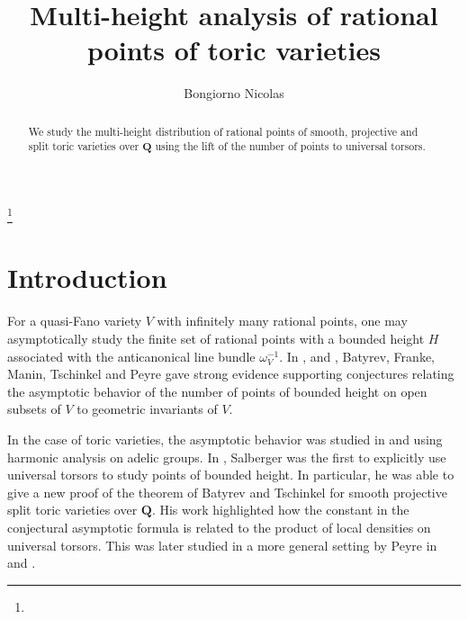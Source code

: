 \documentclass{proc-l}
\newcommand{\Z}{\mathbf{Z}}
\newcommand{\Q}{\mathbf{Q}}
\newcommand{\w}{\omega}
\theoremstyle{definition}
\theoremstyle{remark}
\numberwithin{equation}{section}
\begin{document}
\title[Multi-height analysis on toric varieties]{Multi-height analysis of rational points of toric varieties}


\author{Bongiorno Nicolas}
\address{}
\curraddr{}
\thanks{}




\date{}

\dedicatory{}


\begin{abstract}
We study the multi-height distribution of rational points of smooth, projective and split toric varieties over $\Q$ using the lift of the number of points to universal torsors.
\end{abstract}


\maketitle

\section{Introduction}

For a quasi-Fano variety $V$ with infinitely many rational points, one may asymptotically study the finite set of rational points with a bounded height $H$ associated with the anticanonical line bundle $\w_{V}^{-1}$. In \cite{FrankeManinTschinkel1989}, \cite{Batyrev1990} and \cite{peyre_duke}, Batyrev, Franke, Manin, Tschinkel and Peyre gave strong evidence supporting conjectures relating the asymptotic behavior of the number of points of bounded height on open subsets of $V$ to geometric invariants of $V$.

In the case of toric varieties, the asymptotic behavior was studied in \cite{batyrev_anisotrop_tori} and \cite{batyrev_toric_varieties} using harmonic analysis on adelic groups. In \cite{salberger_torsor}, Salberger was the first to explicitly use universal torsors to study points of bounded height. In particular, he was able to give a new proof of the theorem of Batyrev and Tschinkel for smooth projective split toric varieties over $\Q$. His work highlighted how the constant in the conjectural asymptotic formula is related to the product of local densities on universal torsors. This was later studied in a more general setting by Peyre in \cite{peyre_zeta_height_function} and \cite{methode_du_cercle_peyre}.
\end{document}
